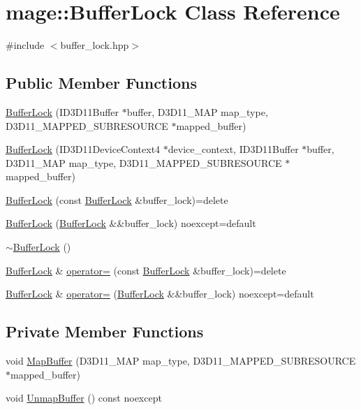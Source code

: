 \hypertarget{classmage_1_1_buffer_lock}{}\section{mage\+:\+:Buffer\+Lock Class Reference}
\label{classmage_1_1_buffer_lock}


{\ttfamily \#include $<$buffer\+\_\+lock.\+hpp$>$}

\subsection*{Public Member Functions}
\begin{DoxyCompactItemize}
\item 
\hyperlink{classmage_1_1_buffer_lock_a9e7c0ebe78a1abc7919afda7c7001bc8}{Buffer\+Lock} (I\+D3\+D11\+Buffer $\ast$buffer, D3\+D11\+\_\+\+M\+AP map\+\_\+type, D3\+D11\+\_\+\+M\+A\+P\+P\+E\+D\+\_\+\+S\+U\+B\+R\+E\+S\+O\+U\+R\+CE $\ast$mapped\+\_\+buffer)
\item 
\hyperlink{classmage_1_1_buffer_lock_a8f19e84733b603ec83bfff50a1f4e789}{Buffer\+Lock} (I\+D3\+D11\+Device\+Context4 $\ast$device\+\_\+context, I\+D3\+D11\+Buffer $\ast$buffer, D3\+D11\+\_\+\+M\+AP map\+\_\+type, D3\+D11\+\_\+\+M\+A\+P\+P\+E\+D\+\_\+\+S\+U\+B\+R\+E\+S\+O\+U\+R\+CE $\ast$mapped\+\_\+buffer)
\item 
\hyperlink{classmage_1_1_buffer_lock_ad600caae6aa80af430c5b5c459137176}{Buffer\+Lock} (const \hyperlink{classmage_1_1_buffer_lock}{Buffer\+Lock} \&buffer\+\_\+lock)=delete
\item 
\hyperlink{classmage_1_1_buffer_lock_a0b5e9aafaeed79eb0cecb2268ac7428d}{Buffer\+Lock} (\hyperlink{classmage_1_1_buffer_lock}{Buffer\+Lock} \&\&buffer\+\_\+lock) noexcept=default
\item 
\hyperlink{classmage_1_1_buffer_lock_ae19ca641f652d9009738c2689a4427d9}{$\sim$\+Buffer\+Lock} ()
\item 
\hyperlink{classmage_1_1_buffer_lock}{Buffer\+Lock} \& \hyperlink{classmage_1_1_buffer_lock_a70e59c28f8e862e16a86ebc31d2f93b1}{operator=} (const \hyperlink{classmage_1_1_buffer_lock}{Buffer\+Lock} \&buffer\+\_\+lock)=delete
\item 
\hyperlink{classmage_1_1_buffer_lock}{Buffer\+Lock} \& \hyperlink{classmage_1_1_buffer_lock_a0c2beef9c8bc64c6fd9d6ca26ac545f7}{operator=} (\hyperlink{classmage_1_1_buffer_lock}{Buffer\+Lock} \&\&buffer\+\_\+lock) noexcept=default
\end{DoxyCompactItemize}
\subsection*{Private Member Functions}
\begin{DoxyCompactItemize}
\item 
void \hyperlink{classmage_1_1_buffer_lock_adcc9d3190b179efb5045f33551e177f7}{Map\+Buffer} (D3\+D11\+\_\+\+M\+AP map\+\_\+type, D3\+D11\+\_\+\+M\+A\+P\+P\+E\+D\+\_\+\+S\+U\+B\+R\+E\+S\+O\+U\+R\+CE $\ast$mapped\+\_\+buffer)
\item 
void \hyperlink{classmage_1_1_buffer_lock_a04b6cec5445a88d27f27cff4e7773535}{Unmap\+Buffer} () const noexcept
\end{DoxyCompactItemize}
